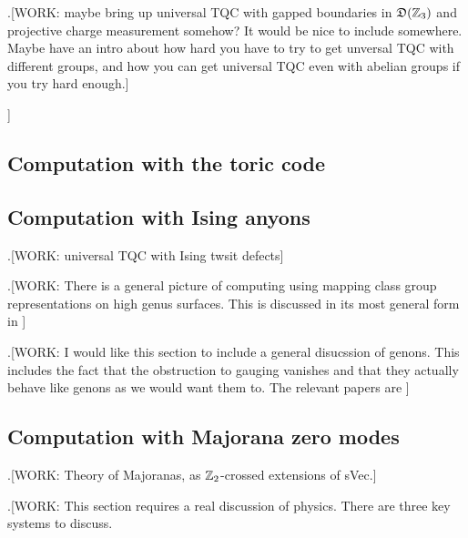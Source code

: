.[WORK: maybe bring up universal TQC with gapped boundaries in $\mathfrak{D}(\mathbb{Z}_3)$ and projective charge measurement somehow? It would be nice to include somewhere. Maybe have an intro about how hard you have to try to get unversal TQC with different groups, and how you can get universal TQC even with abelian groups if you try hard enough.]

]
\subsection{Computation with the toric code}


\subsection{Computation with Ising anyons}

.[WORK: universal TQC with Ising twsit defects]

.[WORK: There is a general picture of computing using mapping class group representations on high genus surfaces. This is discussed in its most general form in \cite{bloomquist2018topological}]


.[WORK: I would like this section to include a general disucssion of genons. This includes the fact that the obstruction to gauging vanishes and that they actually behave like genons as we would want them to. The relevant papers are \cite{gannon2019vanishing, delaney2019categorical, barkeshli2013twist}]


\subsection{Computation with Majorana zero modes}

.[WORK: Theory of Majoranas, as $\mathbb{Z}_2$-crossed extensions of sVec.]

.[WORK: This section requires a real discussion of physics. There are three key systems to discuss.

